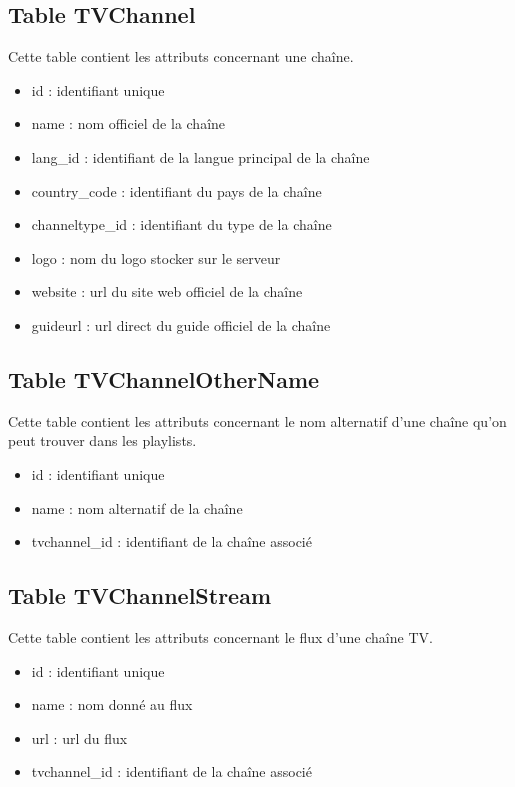 \documentclass[10pt,a4paper]{article}
\begin{document}
\subsection{Table TVChannel}

Cette table contient les attributs concernant une chaîne.

\begin{itemize}
\item id : identifiant unique
\item name : nom officiel de la chaîne
\item lang\_id : identifiant de la langue principal de la chaîne
\item country\_code : identifiant du pays de la chaîne
\item channeltype\_id : identifiant du type de la chaîne
\item logo : nom du logo stocker sur le serveur
\item website : url du site web officiel de la chaîne
\item guideurl : url direct du guide officiel de la chaîne
\end{itemize}

\subsection{Table TVChannelOtherName}

Cette table contient les attributs concernant le nom alternatif d'une chaîne qu'on peut trouver dans les playlists.

\begin{itemize}
\item id : identifiant unique
\item name : nom alternatif de la chaîne
\item tvchannel\_id : identifiant de la chaîne associé
\end{itemize}

\subsection{Table TVChannelStream}

Cette table contient les attributs concernant le flux d'une chaîne TV.

\begin{itemize}
\item id : identifiant unique
\item name : nom donné au flux
\item url : url du flux
\item tvchannel\_id : identifiant de la chaîne associé
\end{itemize}
\end{document}
